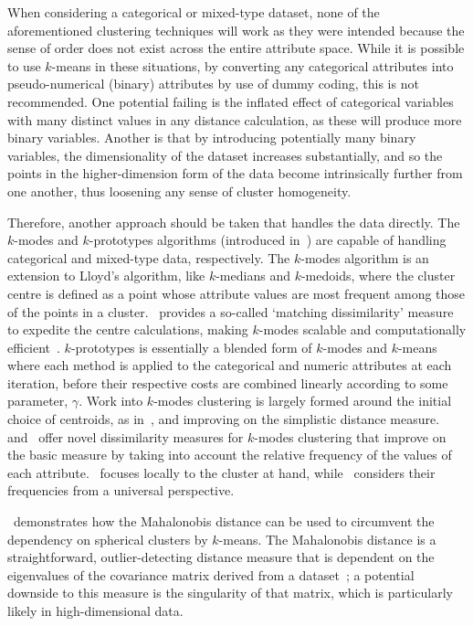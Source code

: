 When considering a categorical or mixed-type dataset, none of the aforementioned
clustering techniques will work as they were intended because the sense of order
does not exist across the entire attribute space. While it is possible to use
\(k\)-means in these situations, by converting any categorical attributes into
pseudo-numerical (binary) attributes by use of dummy coding, this is not
recommended. One potential failing is the inflated effect of categorical
variables with many distinct values in any distance calculation, as these will
produce more binary variables. Another is that by introducing potentially many
binary variables, the dimensionality of the dataset increases substantially, and
so the points in the higher-dimension form of the data become intrinsically
further from one another, thus loosening any sense of cluster homogeneity.

Therefore, another approach should be taken that handles the data directly. The
\(k\)-modes and \(k\)-prototypes algorithms (introduced in~\cite{Huang1998}) are
capable of handling categorical and mixed-type data, respectively. The
\(k\)-modes algorithm is an extension to Lloyd's algorithm, like \(k\)-medians
and \(k\)-medoids, where the cluster centre is defined as a point whose
attribute values are most frequent among those of the points in a
cluster.~\cite{Huang1998} provides a so-called `matching dissimilarity' measure
to expedite the centre calculations, making \(k\)-modes scalable and
computationally efficient~\cite{Madhuri2014}. \(k\)-prototypes is essentially a
blended form of \(k\)-modes and \(k\)-means where each method is applied to the
categorical and numeric attributes at each iteration, before their respective
costs are combined linearly according to some parameter, \(\gamma\). Work into
\(k\)-modes clustering is largely formed around the initial choice of centroids,
as in~\cite{Cao2009,Khan2013}, and improving on the simplistic distance
measure.~\cite{Ng2007} and~\cite{Cao2012} offer novel dissimilarity measures for
\(k\)-modes clustering that improve on the basic measure by taking into account
the relative frequency of the values of each attribute.~\cite{Ng2007} focuses
locally to the cluster at hand, while~\cite{Cao2012} considers their frequencies
from a universal perspective.

\cite{Sung1998}~demonstrates how the Mahalonobis distance can be used to
circumvent the dependency on spherical clusters by \(k\)-means. The Mahalonobis
distance is a straightforward, outlier-detecting distance measure that is
dependent on the eigenvalues of the covariance matrix derived from a
dataset~\cite{Mahalonobis1936}; a potential downside to this measure is the
singularity of that matrix, which is particularly likely in high-dimensional
data.

